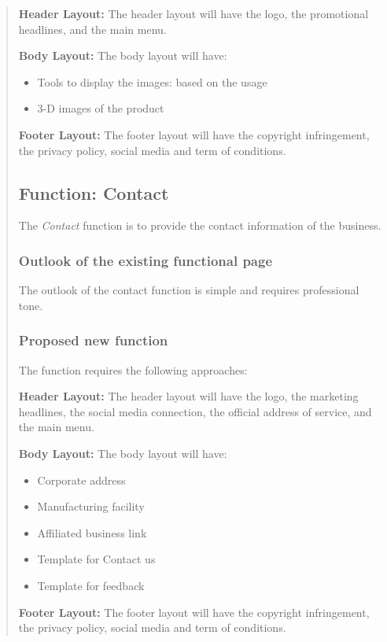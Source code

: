 \documentclass[35pt]{report}
\begin{document}
\begin{quote}
				{\bfseries Header Layout:} The header layout will have the logo, the promotional headlines, and the main menu.     

				{\bfseries Body Layout:} The body layout will have:
				\begin{itemize}
					\item Tools to display the images: based on the usage
					\item 3-D images of the product
				\end{itemize}

				{\bfseries Footer Layout:} The footer layout will have the copyright infringement, the privacy policy, social media and term of conditions.

			\subsection{Function: Contact}
				The {\it Contact} function is to provide the contact information of the business. 

				\subsubsection{Outlook of the existing functional page}
				The outlook of the contact function is simple and requires professional tone. 
				
				\subsubsection{Proposed new function}
				The function requires the following approaches:

				{\bfseries Header Layout:} The header layout will have the logo, the marketing headlines, the social media connection, the official address of service, and the main menu.     

				{\bfseries Body Layout:} The body layout will have:
				\begin{itemize}
					\item Corporate address
					\item Manufacturing facility
					\item Affiliated business link
					\item Template for Contact us
					\item Template for feedback   
					\end{itemize}

				{\bfseries Footer Layout:} The footer layout will have the copyright infringement, the privacy policy, social media and term of conditions.

		\end{quote}
		\clearpage	
		
\end{document}
